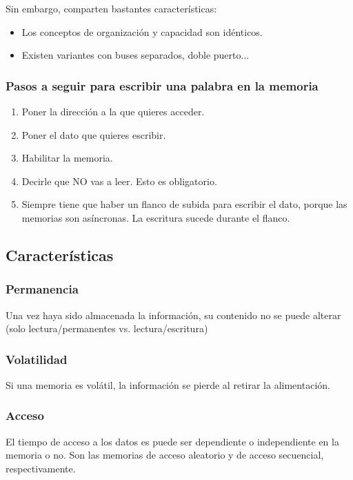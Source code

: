 \documentclass[a4paper]{book}
\begin{document}
Sin embargo, comparten bastantes características:
\begin{itemize}
	\item Los conceptos de organización y capacidad son idénticos.
	\item Existen variantes con buses separados, doble puerto...
\end{itemize}

\subsubsection{Pasos a seguir para escribir una palabra en la memoria}
\begin{enumerate}
	\item Poner la dirección a la que quieres acceder.
	\item Poner el dato que quieres escribir.
	\item Habilitar la memoria.
	\item Decirle que NO vas a leer. Esto es obligatorio.
	\item Siempre tiene que haber un flanco de subida para escribir el dato, porque las memorias son asíncronas. La escritura sucede durante el flanco.
\end{enumerate}

\subsection{Características}

\subsubsection{Permanencia}

Una vez haya sido almacenada la información, su contenido no se puede alterar (solo lectura/permanentes vs. lectura/escritura)

\subsubsection{Volatilidad}

Si una memoria es volátil, la información se pierde al retirar la alimentación.

\subsubsection{Acceso}

El tiempo de acceso a los datos es puede ser dependiente o independiente en la memoria o no. Son las memorias de acceso aleatorio y de acceso secuencial, respectivamente.
\end{document}
